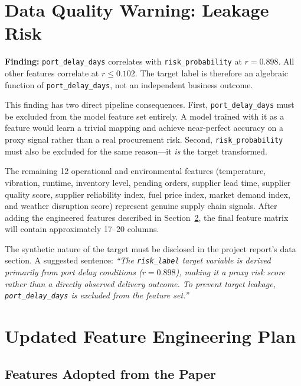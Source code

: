 \documentclass[11pt,a4paper]{article}
\begin{document}
\section{Data Quality Warning: Leakage Risk}
\label{sec:leakage}

\begin{tcolorbox}[warningbox]
\textbf{Finding:} \texttt{port\_delay\_days} correlates with \texttt{risk\_probability}
at $r = 0.898$. All other features correlate at $r \leq 0.102$. The target label is
therefore an algebraic function of \texttt{port\_delay\_days}, not an independent
business outcome.
\end{tcolorbox}

This finding has two direct pipeline consequences. First, \texttt{port\_delay\_days}
must be excluded from the model feature set entirely. A model trained with it as a
feature would learn a trivial mapping and achieve near-perfect accuracy on a proxy
signal rather than a real procurement risk. Second, \texttt{risk\_probability} must
also be excluded for the same reason---it \textit{is} the target transformed.

The remaining 12 operational and environmental features (temperature, vibration,
runtime, inventory level, pending orders, supplier lead time, supplier quality score,
supplier reliability index, fuel price index, market demand index, and weather
disruption score) represent genuine supply chain signals. After adding the engineered
features described in Section~\ref{sec:feature-eng}, the final feature matrix will
contain approximately 17--20 columns.

The synthetic nature of the target must be disclosed in the project report's data
section. A suggested sentence: \textit{``The \texttt{risk\_label} target variable is
derived primarily from port delay conditions ($r = 0.898$), making it a proxy risk
score rather than a directly observed delivery outcome. To prevent target leakage,
\texttt{port\_delay\_days} is excluded from the feature set.''}

\section{Updated Feature Engineering Plan}
\label{sec:feature-eng}

\subsection{Features Adopted from the Paper}
\end{document}
